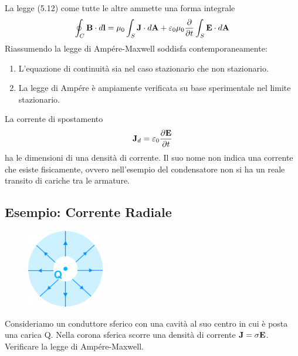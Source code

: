 La legge (5.12) come tutte le altre ammette una forma integrale 
\begin{equation}
	\oint_{C} \bold{B} \cdot d \bold{l} = \mu_0 \int_{S} \bold{J} \cdot d \bold{A} + \varepsilon_0 \mu_0 \frac{\partial }{\partial t} \int_{S} \bold{E} \cdot d \bold{A} 
\end{equation}
Riassumendo la legge di Amp\'ere-Maxwell soddisfa contemporaneamente:
\begin{enumerate}
	\item L'equazione di continuit\`a sia nel caso stazionario che non stazionario.
	\item La legge di Amp\'ere \`e ampiamente verificata su base sperimentale nel limite stazionario.
\end{enumerate}
La corrente di spostamento 
\begin{equation}
	\bold{J}_d =  \varepsilon_0 \frac{\partial \bold{E}}{\partial t}
\end{equation}
ha le dimensioni di una densit\`a di corrente. Il suo nome non indica una corrente che esiste fisicamente, ovvero nell'esempio del condensatore non si ha un reale transito di cariche tra le armature.

\subsection{Esempio: Corrente Radiale}

\begin{figure}  %
    \centering
    \includegraphics[width=0.3\textwidth]{images/spheric_surface}
\end{figure}
Consideriamo un conduttore sferico con una cavit\`a al suo centro in cui \`e posta una carica Q. Nella corona sferica scorre una densit\`a di corrente $\bold{J} = \sigma \bold{E}$. Verificare la legge di Amp\'ere-Maxwell.

